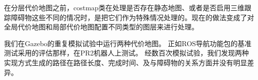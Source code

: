 在分层代价地图之前，costmap类在处理是否存在静态地图、或者是否启用三维跟踪障碍物这些不同的情况时，是把它们作为特殊情况处理的。现在的做法变成了对全局代价地图和局部代价地图配置不同类型的图层来进行处理。


我们在Gazebo的重复模拟试验中运行两种代价地图。 正如ROS导航功能包的基准测试采用的评估那样\cite{marder2010office}，在PR2机器人上测试。 
经数百次模拟试验，我们发现两种实现方式生成的路径在路径长度、完成时间、及与障碍物的关系方面并没有明显差异。

